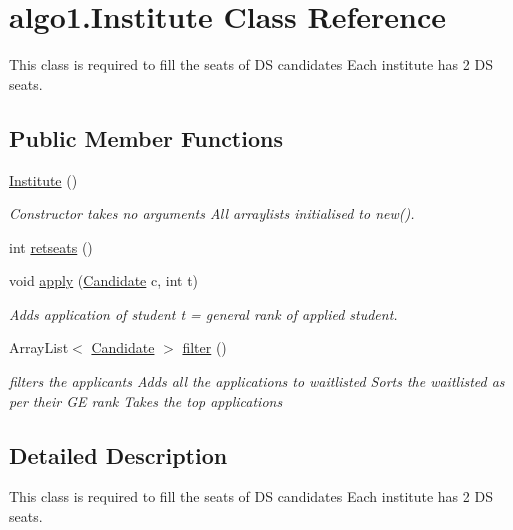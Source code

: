\hypertarget{classalgo1_1_1Institute}{\section{algo1.\+Institute Class Reference}
\label{classalgo1_1_1Institute}
}


This class is required to fill the seats of D\+S candidates Each institute has 2 D\+S seats.  


\subsection*{Public Member Functions}
\begin{DoxyCompactItemize}
\item 
\hypertarget{classalgo1_1_1Institute_a66f696cc392ea7beed38e13b78a8077b}{\hyperlink{classalgo1_1_1Institute_a66f696cc392ea7beed38e13b78a8077b}{Institute} ()}\label{classalgo1_1_1Institute_a66f696cc392ea7beed38e13b78a8077b}

\begin{DoxyCompactList}\small\item\em Constructor takes no arguments All arraylists initialised to new(). \end{DoxyCompactList}\item 
int \hyperlink{classalgo1_1_1Institute_aeb65ca001f3ffdc633ef88eb471be498}{retseats} ()
\item 
void \hyperlink{classalgo1_1_1Institute_a3ed297de4490738ce938b4f30c64d917}{apply} (\hyperlink{classalgo1_1_1Candidate}{Candidate} c, int t)
\begin{DoxyCompactList}\small\item\em Adds application of student t = general rank of applied student. \end{DoxyCompactList}\item 
Array\+List$<$ \hyperlink{classalgo1_1_1Candidate}{Candidate} $>$ \hyperlink{classalgo1_1_1Institute_a925b7fb3ae1b0a7cf133d00023b8b6c3}{filter} ()
\begin{DoxyCompactList}\small\item\em filters the applicants Adds all the applications to waitlisted Sorts the waitlisted as per their G\+E rank Takes the top applications \end{DoxyCompactList}\end{DoxyCompactItemize}


\subsection{Detailed Description}
This class is required to fill the seats of D\+S candidates Each institute has 2 D\+S seats. 

